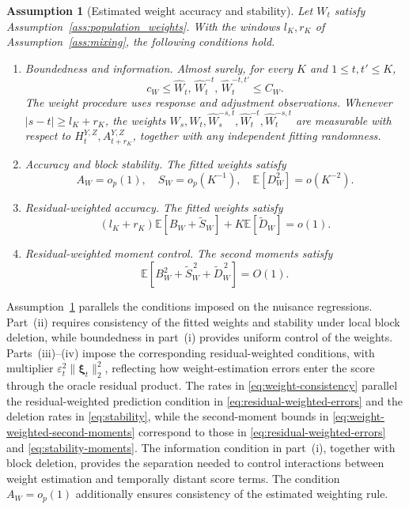 \documentclass[12pt]{article}
\def\E{\mathbb{E}}
\newtheorem{assumption}[theorem]{Assumption}
\numberwithin{equation}{section}
\begin{document}
\begin{assumption}[Estimated weight accuracy and stability]
\label{ass:estimated_weights}
Let \(W_t\) satisfy Assumption~\ref{ass:population_weights}. With the
windows \(l_K,r_K\) of Assumption~\ref{ass:mixing}, the following
conditions hold.
\begin{enumerate}
    \item[(i)] \textit{Boundedness and information.} Almost surely, for
    every \(K\) and \(1\leq t,t'\leq K\),
    \[
    c_W\leq\hat W_t,\,\hat W_t^{-t},\,\hat W_t^{-t,t'}\leq C_W.
    \]
    The weight procedure uses response and adjustment observations.
    Whenever \(|s-t|\geq l_K+r_K\), the weights
    \(W_s,W_t,\hat W_s^{-s,t},\hat W_t^{-t},\hat W_t^{-s,t}\)
    are measurable with respect to
    \(H_t^{Y,Z},A_{t+r_K}^{Y,Z}\), together with any independent
    fitting randomness.

    \item[(ii)] \textit{Accuracy and block stability.} The fitted weights satisfy
    \begin{equation}
    \label{eq:weight-stability-moments}
    A_W=o_p(1),\quad S_W=o_p(K^{-1}), \quad \E[D_W^2]=o(K^{-2}).
    \end{equation}

    \item[(iii)] \textit{Residual-weighted accuracy.}
    The fitted weights satisfy
    \begin{equation}
    \label{eq:weight-consistency}
(l_K+r_K)\E[B_W+\tilde S_W]
+K\E[\tilde D_W]=o(1).
    \end{equation}

    \item[(iv)] \textit{Residual-weighted moment control.}
    The second moments satisfy
    \begin{equation}
    \label{eq:weight-weighted-second-moments}
    \E[B_W^2+\tilde S_W^{\,2}+\tilde D_W^{\,2}]=O(1).
    \end{equation}

\end{enumerate}
\end{assumption}

Assumption~\ref{ass:estimated_weights} parallels the conditions imposed on
the nuisance regressions. Part~(ii) requires consistency of the fitted
weights and stability under local block deletion, while boundedness in
part~(i) provides uniform control of the weights. Parts~(iii)--(iv) impose
the corresponding residual-weighted conditions, with multiplier
\(\varepsilon_t^2\|\boldsymbol\xi_t\|_2^2\), reflecting how weight-estimation
errors enter the score through the oracle residual product. The rates in
\eqref{eq:weight-consistency} parallel the residual-weighted prediction
condition in \eqref{eq:residual-weighted-errors} and the deletion rates in
\eqref{eq:stability}, while the second-moment bounds in
\eqref{eq:weight-weighted-second-moments} correspond to those in
\eqref{eq:residual-weighted-errors} and \eqref{eq:stability-moments}.
The information condition in part~(i), together with block deletion, provides
the separation needed to control interactions between weight estimation and
temporally distant score terms. The condition \(A_W=o_p(1)\) additionally
ensures consistency of the estimated weighting rule.
\end{document}
